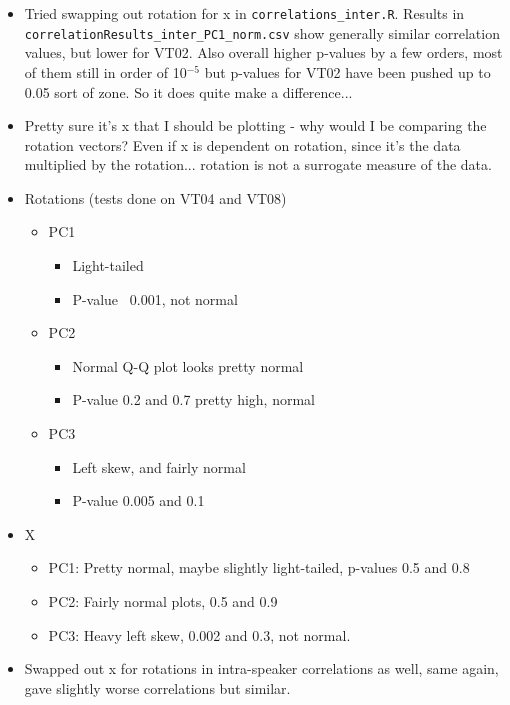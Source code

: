 \documentclass{article}
\begin{document}
\begin{itemize}
\begin{itemize}
        \item Tried swapping out rotation for x in \verb|correlations_inter.R|. Results in \verb|correlationResults_inter_PC1_norm.csv| show generally similar correlation values, but lower for VT02. Also overall higher p-values by a few orders, most of them still in order of 10$^{-5}$ but p-values for VT02 have been pushed up to 0.05 sort of zone. So it does quite make a difference...
        \item Pretty sure it's x that I should be plotting - why would I be comparing the rotation vectors? Even if x is dependent on rotation, since it's the data multiplied by the rotation... rotation is not a surrogate measure of the data.
        \item Rotations (tests done on VT04 and VT08)
        \begin{itemize}
            \item PC1
            \begin{itemize}
                \item Light-tailed
                \item P-value ~0.001, not normal
            \end{itemize} 
            \item PC2
            \begin{itemize}
                \item Normal Q-Q plot looks pretty normal
                \item P-value 0.2 and 0.7 pretty high, normal
            \end{itemize}
            \item PC3
            \begin{itemize}
                \item Left skew, and fairly normal
                \item P-value 0.005 and 0.1
            \end{itemize}
        \end{itemize}
        \item X
        \begin{itemize}
            \item PC1: Pretty normal, maybe slightly light-tailed, p-values 0.5 and 0.8
            \item PC2: Fairly normal plots, 0.5 and 0.9
            \item PC3: Heavy left skew, 0.002 and 0.3, not normal.
        \end{itemize}
        \item Swapped out x for rotations in intra-speaker correlations as well, same again, gave slightly worse correlations but similar.

\end{itemize}
\end{itemize}
\end{document}
